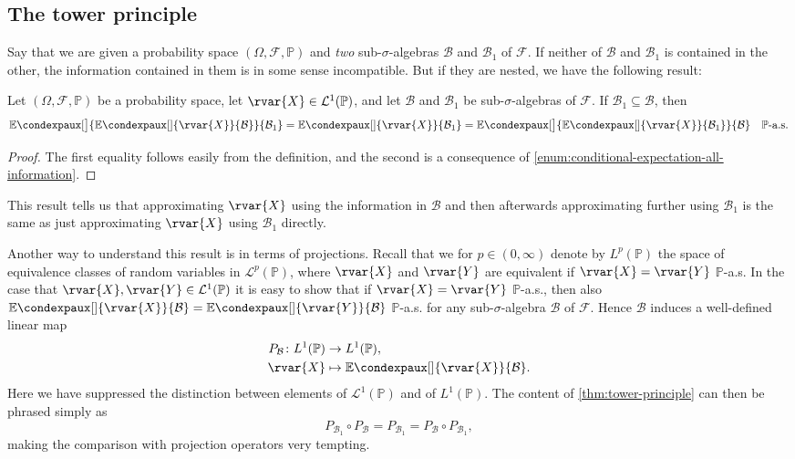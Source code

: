 \documentclass[article, a4paper, 11pt, oneside]{memoir}
\numberwithin{equation}{chapter}
\newcommand{\calB}{\mathcal{B}}
\newcommand{\calF}{\mathcal{F}}
\newcommand{\calL}{\mathcal{L}}
\renewcommand{\P}{\mathbb{P}}
\newcommand{\condexp}[3][]{{\mathbb{E}\condexpaux[#1]{#2}{#3}}}
\begin{document}
\subsection{The tower principle}

Say that we are given a probability space $(\Omega,\calF,\P)$ and \emph{two} sub-$\sigma$-algebras $\calB$ and $\calB_1$ of $\calF$. If neither of $\calB$ and $\calB_1$ is contained in the other, the information contained in them is in some sense incompatible. But if they are nested, we have the following result:

\begin{proposition}
    \label{thm:tower-principle}
    Let $(\Omega,\calF,\P)$ be a probability space, let $\rvar{X} \in \calL^1(\P)$, and let $\calB$ and $\calB_1$ be sub-$\sigma$-algebras of $\calF$. If $\calB_1 \subseteq \calB$, then
    \begin{equation*}
        \condexp[\big]{
            \condexp{\rvar{X}}{\calB}
        }{\calB_1}
        =
        \condexp{\rvar{X}}{\calB_1}
        =
        \condexp[\big]{
            \condexp{\rvar{X}}{\calB_1}
        }{\calB}
        \quad \text{$\P$-a.s.}
    \end{equation*}
\end{proposition}

\begin{proof}
    The first equality follows easily from the definition, and the second is a consequence of \cref{enum:conditional-expectation-all-information}.
\end{proof}
%
This result tells us that approximating $\rvar{X}$ using the information in $\calB$ and then afterwards approximating further using $\calB_1$ is the same as just approximating $\rvar{X}$ using $\calB_1$ directly.

Another way to understand this result is in terms of projections. Recall that we for $p \in (0,\infty)$ denote by $L^p(\P)$ the space of equivalence classes of random variables in $\calL^p(\P)$, where $\rvar{X}$ and $\rvar{Y}$ are equivalent if $\rvar{X} = \rvar{Y}$ $\P$-a.s. In the case that $\rvar{X}, \rvar{Y} \in \calL^1(\P)$ it is easy to show that if $\rvar{X} = \rvar{Y}$ $\P$-a.s., then also $\condexp{\rvar{X}}{\calB} = \condexp{\rvar{Y}}{\calB}$ $\P$-a.s. for any sub-$\sigma$-algebra $\calB$ of $\calF$. Hence $\calB$ induces a well-defined linear map
%
\begin{align*}
    P_\calB \colon L^1(\P) &\to L^1(\P), \\
    \rvar{X} &\mapsto \condexp{\rvar{X}}{\calB}.
\end{align*}
%
Here we have suppressed the distinction between elements of $\calL^1(\P)$ and of $L^1(\P)$. The content of \cref{thm:tower-principle} can then be phrased simply as
%
\begin{equation*}
    P_{\calB_1} \circ P_\calB
        = P_{\calB_1}
        = P_\calB \circ P_{\calB_1},
\end{equation*}
%
making the comparison with projection operators very tempting.
\end{document}
